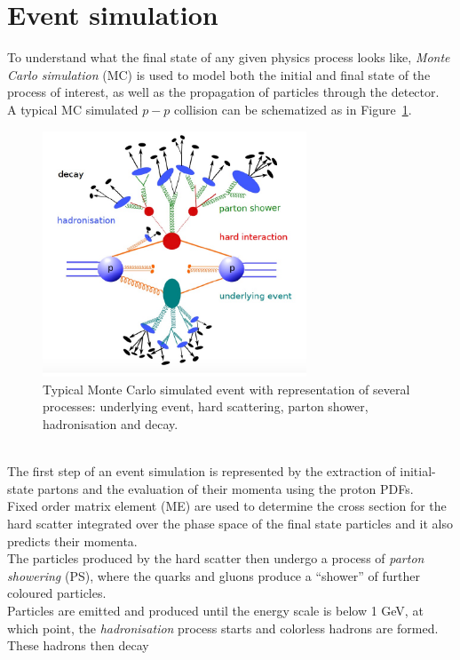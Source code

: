 \section{Event simulation}
To understand what the final state of any given physics process looks like,
\textit{Monte Carlo simulation} (MC) is used to model both the initial and final state of the 
process of interest, as well as the propagation of particles through the detector. \\
A typical MC simulated $p-p$ collision can be schematized as in Figure~\ref{fig:MC}.
\begin{figure}[h]
	\centering
	\includegraphics[width=0.7\textwidth]{Chapters/CH4/figures/MC}
	\caption{Typical Monte Carlo simulated event with representation of several processes: underlying event, hard scattering, parton shower, hadronisation and decay.}
	\label{fig:MC}
\end{figure}
\\ The first step of an event simulation is represented by the extraction of initial-state partons and the evaluation of their momenta using the proton PDFs.\\
Fixed order matrix element (ME) are used to determine the cross section for the hard scatter 
integrated over the phase space of the final state particles and it also predicts their momenta.\\
The particles produced by the hard scatter then undergo a process of \textit{parton showering} 
(PS), where the quarks and gluons produce a “shower” of further coloured particles.\\
Particles are emitted and produced until the energy scale is below 1 GeV, at which point, the 
\textit{hadronisation} process starts and colorless hadrons are formed. These hadrons then decay 
